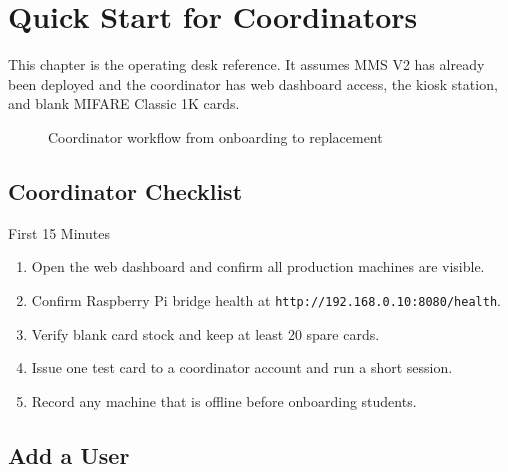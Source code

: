 \chapter{Quick Start for Coordinators}
\label{ch:quick_start}

This chapter is the operating desk reference. It assumes MMS V2 has already been deployed and the coordinator has web dashboard access, the kiosk station, and blank MIFARE Classic 1K cards.

\begin{figure}[H]
\centering
{}
\caption{Coordinator workflow from onboarding to replacement}
\label{fig:coordinator_workflow}
\end{figure}

\section{Coordinator Checklist}

\begin{runbookbox}{First 15 Minutes}
\begin{enumerate}[leftmargin=1.5em]
    \item Open the web dashboard and confirm all production machines are visible.
    \item Confirm Raspberry Pi bridge health at \texttt{http://192.168.0.10:8080/health}.
    \item Verify blank card stock and keep at least 20 spare cards.
    \item Issue one test card to a coordinator account and run a short session.
    \item Record any machine that is offline before onboarding students.
\end{enumerate}
\end{runbookbox}

\section{Add a User}

